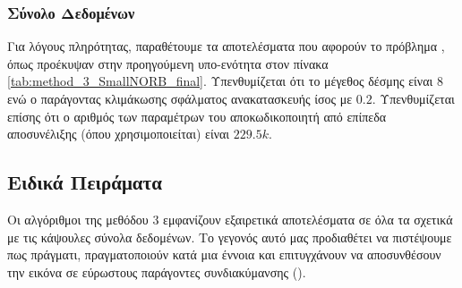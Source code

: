 \subsubsection{Σύνολο Δεδομένων }

Για λόγους πληρότητας, παραθέτουμε τα αποτελέσματα που αφορούν το πρόβλημα , όπως προέκυψαν στην προηγούμενη υπο-ενότητα στον πίνακα \ref{tab:method_3_SmallNORB_final}. Υπενθυμίζεται ότι το μέγεθος δέσμης είναι 8 ενώ ο παράγοντας κλιμάκωσης σφάλματος ανακατασκευής ίσος με $0.2$. Υπενθυμίζεται επίσης ότι ο αριθμός των παραμέτρων του αποκωδικοποιητή από επίπεδα αποσυνέλιξης (όπου χρησιμοποιείται) είναι $229.5k$.

\begin{table}[h]
    \begin{center}
    \end{center}
    \caption[]{\label{tab:method_3_SmallNORB_final}Επίδωση των αλγορίθμων της μεθόδου 3 στο σύνολο δεδομένων , όταν χρησιμοποιούνται 30 εποχές για την εκπαίδευση του μοντέλου με μέγεθος δέσμης 8.} 
\end{table}

\subsection{Ειδικά Πειράματα}
Οι αλγόριθμοι της μεθόδου 3 εμφανίζουν εξαιρετικά αποτελέσματα σε όλα τα σχετικά με τις κάψουλες σύνολα δεδομένων. Το γεγονός αυτό μας προδιαθέτει να πιστέψουμε πως πράγματι, πραγματοποιούν κατά μια έννοια  και επιτυγχάνουν να αποσυνθέσουν την εικόνα σε εύρωστους παράγοντες συνδιακύμανσης ().\par

